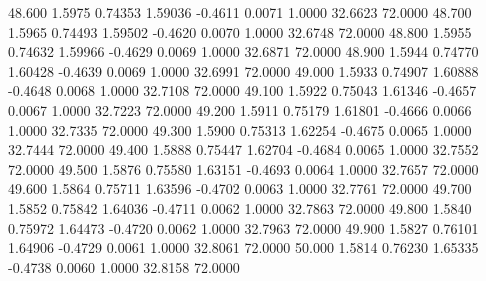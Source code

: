   48.600   1.5975   0.74353   1.59036  -0.4611   0.0071   1.0000  32.6623  72.0000
  48.700   1.5965   0.74493   1.59502  -0.4620   0.0070   1.0000  32.6748  72.0000
  48.800   1.5955   0.74632   1.59966  -0.4629   0.0069   1.0000  32.6871  72.0000
  48.900   1.5944   0.74770   1.60428  -0.4639   0.0069   1.0000  32.6991  72.0000
  49.000   1.5933   0.74907   1.60888  -0.4648   0.0068   1.0000  32.7108  72.0000
  49.100   1.5922   0.75043   1.61346  -0.4657   0.0067   1.0000  32.7223  72.0000
  49.200   1.5911   0.75179   1.61801  -0.4666   0.0066   1.0000  32.7335  72.0000
  49.300   1.5900   0.75313   1.62254  -0.4675   0.0065   1.0000  32.7444  72.0000
  49.400   1.5888   0.75447   1.62704  -0.4684   0.0065   1.0000  32.7552  72.0000
  49.500   1.5876   0.75580   1.63151  -0.4693   0.0064   1.0000  32.7657  72.0000
  49.600   1.5864   0.75711   1.63596  -0.4702   0.0063   1.0000  32.7761  72.0000
  49.700   1.5852   0.75842   1.64036  -0.4711   0.0062   1.0000  32.7863  72.0000
  49.800   1.5840   0.75972   1.64473  -0.4720   0.0062   1.0000  32.7963  72.0000
  49.900   1.5827   0.76101   1.64906  -0.4729   0.0061   1.0000  32.8061  72.0000
  50.000   1.5814   0.76230   1.65335  -0.4738   0.0060   1.0000  32.8158  72.0000
